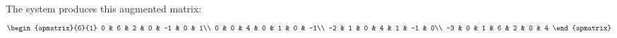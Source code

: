 \documentclass[a4paper]{article}
\begin{document}

\subsection{~}

The system produces this augmented matrix:
$$\begin{apmatrix}{6}{1}
0 & 6 & 2 & 0 & -1 & 0 & 1\\
0 & 0 & 4 & 0 & 1 & 0 & -1\\
-2 & 1 & 0 & 4 & 1 & -1 & 0\\
-3 & 0 & 1 & 6 & 2 & 0 & 4
\end{apmatrix}$$

\subsection{~}
\end{document}
